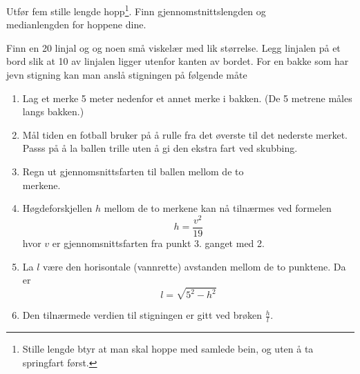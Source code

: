 Utfør fem stille lengde hopp\footnote{Stille lengde btyr at man skal hoppe med samlede bein, og uten å ta springfart først.}. Finn gjennomstnittslengden og\\ medianlengden for hoppene dine.

Finn en 20 linjal og og noen små viskelær med lik størrelse. Legg linjalen på et bord slik at 10 av linjalen ligger utenfor kanten av bordet.
\newpage
{}
For en bakke som har jevn stigning kan man anslå stigningen på følgende måte
\begin{enumerate}
	\item Lag et merke 5 meter nedenfor et annet merke i bakken. (De 5 metrene måles langs bakken.)
	\item Mål tiden en fotball bruker på å rulle fra det øverste til det nederste merket. Passs på å la ballen trille uten å gi den ekstra fart ved skubbing.
	\item Regn ut gjennomsnittsfarten til ballen mellom de to \\merkene.
	\item Høgdeforskjellen $ h $ mellom de to merkene kan nå tilnærmes ved formelen
	\[ h= \frac{v^2}{19}\]
	hvor $ v $ er gjennomsnittsfarten fra punkt 3. ganget med 2.
	\item La $ l $ være den horisontale  (vannrette) avstanden mellom de to punktene. Da er
	\[ l=\sqrt{5^2-h^2} \]
	\item Den tilnærmede verdien til stigningen er gitt ved brøken $ \frac{h}{l} $.
\end{enumerate}

